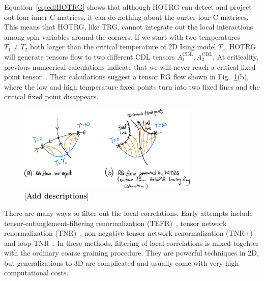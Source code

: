 \documentclass[aps,prb,reprint,superscriptaddress]{revtex4-2}
\begin{document}
%
Equation~\eqref{eq:cdlHOTRG} shows that although HOTRG can detect and
project out four inner C matrices, it can do nothing about the ourter
four C matrices. This means that HOTRG, like TRG, cannot integrate out
the local interactions among spin variables around the corners. If we
start with two temperatures $T_1 \neq T_2$ both larger than the critical
temperature of 2D Ising model $T_c$, HOTRG will generate tensors flow to
two different CDL tensors $A^{\text{CDL}}_1, A^{\text{CDL}}_2$. At
criticality, previous numcerical calculations indicate that we will
never reach a critical fixed-point tensor~\cite{Berker2008,tnr}. Their
calculations suggest a tensor RG flow shown in
Fig.~\ref{fig:tensorRGflow}(b), where the low and high temperature fixed
points turn into two fixed lines and the critical fixed point
disappears.
%
\begin{figure}[h]
    \includegraphics[width=8.6cm]{./figs/tensorRGflowSchem}
    \caption{\label{fig:tensorRGflow}[\textbf{Add descriptions}]}
\end{figure}
%

There are many ways to filter out the local correlations. Early attempts
include tensor-entanglement-filtering renormalization
(TEFR)~\cite{GuWen2009}, tensor network renormalization
(TNR)~\cite{tnr,tnralgo}, non-negative tensor network renormalization
(TNR+)~\cite{tnrplus} and loop-TNR~\cite{looptnr}. In these methods,
filtering of local correlations is mixed togehter with the ordinary
coarse graining procedure. They are powerful techniques in 2D, but
generalizations to 3D are complicated and usually come with very high
computational costs. 
%
\end{document}
